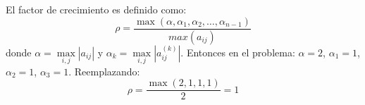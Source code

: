 \begin{enumerate}[]
    El factor de crecimiento es definido como:
    \begin{equation}
        \rho = \frac{\max \left( \alpha, \alpha_1, \alpha_2, \dots, \alpha_{n-1} \right) }{max(a_{ij})}
    \end{equation}
    donde $\alpha = \underset{i,j}{\max} |a_{ij}|$ y $\alpha_k = \underset{i,j}{\max} |a_{ij}^{(k)}|$. Entonces en el problema: $\alpha = 2$, $\alpha_1 = 1$, $\alpha_2 = 1$, $\alpha_3 = 1$. Reemplazando: 
    \begin{equation}
        \rho = \frac{\max \left( 2, 1, 1, 1 \right) }{2} = 1
    \end{equation}
    
\end{enumerate}

